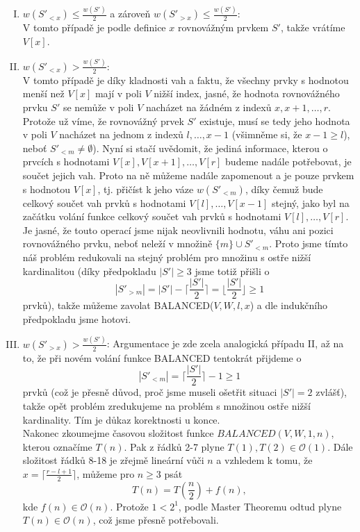 \documentclass[12pt,a4paper]{article}
\theoremstyle{plain}
\begin{document}
\begin{enumerate}[I.]
\item $w(S'_{<x})\leq\frac{w(S')}{2}$ a zároveň $w(S'_{>x})\leq\frac{w(S')}{2}$:\\
V tomto případě je podle definice $x$ rovnovážným prvkem $S'$, takže vrátíme $V[x]$.
\item $w(S'_{<x})>\frac{w(S')}{2}$:\\
V tomto případě je díky kladnosti vah a faktu, že všechny prvky s hodnotou menší než $V[x]$ mají v poli $V$ nižší index, jasné, že hodnota rovnovážného prvku $S'$ se nemůže v poli $V$ nacházet na žádném z indexů $x,x+1,\dots,r$. Protože už víme, že rovnovážný prvek $S'$ existuje, musí se tedy jeho hodnota v poli $V$ nacházet na jednom z indexů $l,\dots,x-1$ (všimněme si, že $x-1\geq l$), neboť $S'_{<m}\neq \emptyset$). Nyní si stačí uvědomit, že jediná informace, kterou o prvcích s hodnotami $V[x],V[x+1],\dots,V[r]$ budeme nadále potřebovat, je součet jejich vah. Proto na ně můžeme nadále zapomenout a  je pouze prvkem s hodnotou $V[x]$, tj. přičíst k jeho váze $w(S'_{<m})$, %
 díky čemuž bude celkový součet vah prvků s hodnotami $V[l],\dots, V[x-1]$ stejný, jako byl na začátku volání funkce celkový součet vah prvků s hodnotami $V[l],\dots, V[r]$. Je jasné, že touto operací jsme nijak neovlivnili hodnotu, váhu ani pozici rovnovážného prvku, neboť neleží v množině $\{m\}\cup S'_{<m}$. Proto jsme tímto náš problém redukovali na stejný problém pro množinu s ostře nižší kardinalitou (díky předpokladu $|S'|\geq 3$ jsme totiž přišli o $$|S'_{>m}|=|S'|-\lceil \frac{|S'|}{2}\rceil=\lfloor \frac{|S'|}{2}\rfloor\geq 1$$ prvků), takže můžeme zavolat BALANCED($V,W,l,x$) a dle indukčního předpokladu jsme hotovi.
\item $w(S'_{>x})>\frac{w(S')}{2}$:
Argumentace je zde zcela analogická případu II, až na to, že při novém volání funkce BALANCED tentokrát přijdeme o $$|S'_{<m}|=\lceil \frac{|S'|}{2}\rceil-1\geq 1$$ prvků (což je přesně důvod, proč jsme museli ošetřit situaci $|S'|=2$ zvlášť), takže opět problém zredukujeme na problém s množinou ostře nižší kardinality.
Tím je důkaz korektnosti u konce.\\

Nakonec zkoumejme časovou složitost funkce $BALANCED(V,W,1,n)$, kterou označíme $T(n)$. Pak z řádků 2-7 plyne $T(1),T(2)\in\mathcal{O}(1)$. Dále složitost řádků 8-18 je zřejmě lineární vůči $n$ a vzhledem k tomu, že $x=\lceil \frac{r-l+1}{2}\rceil$, můžeme pro $n\geq 3$ psát
$$T(n)=T(\frac{n}{2})+f(n),$$ kde $f(n)\in\mathcal{O}(n)$. Protože $1<2^1$, podle Master Theoremu odtud plyne $T(n)\in\mathcal{O}(n)$, což jsme přesně potřebovali. 
\end{enumerate}
\end{document}
